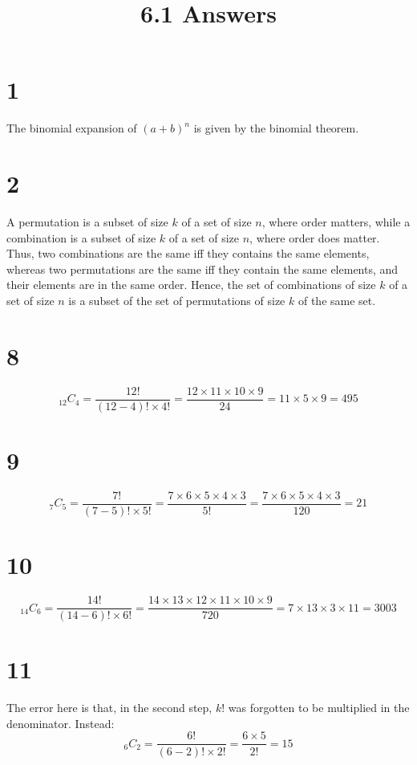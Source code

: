 \documentclass{article}
\title{6.1 Answers}
\theoremstyle{definition}
\newcommand{\?}{\stackrel{?}{=}}
\begin{document}
\maketitle

\section*{1}
The binomial expansion of $(a+b)^n$ is given by the binomial theorem.

\section*{2}
A permutation is a subset of size $k$ of a set of size $n$, where order matters, while a combination is a subset of size $k$ of a set of size $n$, where order does matter. 
Thus, two combinations are the same iff they contains the same elements, whereas two permutations are the same iff they contain the same elements, and their elements are in the same order. Hence, the set of combinations 
of size $k$ of a set of size $n$ is a subset of the set of permutations of size $k$ of the same set. 

\section*{8}
\[ _{12}C_4=\frac{12!}{(12-4)!\times 4!}=\frac{12\times 11\times 10\times 9}{24}=11\times 5\times 9=495 \]

\section*{9}
\[ _7C_5=\frac{7!}{(7-5)!\times 5!}=\frac{7\times 6\times 5\times 4\times 3}{5!}=\frac{7\times 6\times 5\times 4\times 3}{120}=21 \]

\section*{10}
\[ _{14}C_6=\frac{14!}{(14-6)!\times 6!}=\frac{14\times 13\times 12\times 11\times 10\times 9}{720}=7\times 13\times 3\times 11=3003 \]

\section*{11}
The error here is that, in the second step, $k!$ was forgotten to be multiplied in the denominator. Instead:
\[ _6C_2=\frac{6!}{(6-2)!\times 2!}=\frac{6\times 5}{2!}=15 \]
\end{document}
